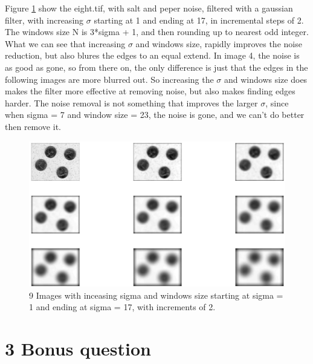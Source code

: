 \documentclass[11pt]{report}
\begin{document}
Figure \ref{fig:2_5} show the eight.tif, with salt and peper noise, filtered with a gaussian filter, with increasing $\sigma$ starting at 1 and ending at 17, in incremental steps of 2. The windows size N is 3*sigma + 1, and then rounding up to nearest odd integer. What we can see that increasing $\sigma$ and windows size, rapidly improves the noise reduction, but also blures the edges to an equal extend. In image 4, the noise is as good as gone, so from there on, the only difference is just that the edges in the following images are more blurred out. So increasing the $\sigma$ and windows size does makes the filter more effective at removing noise, but also makes finding edges harder. The noise removal is not something that improves the larger $\sigma$, since when sigma = 7 and window size = 23, the noise is gone, and we can't do better then remove it.
\begin{figure}[!ht]
    \centering
    \includegraphics[width=1\textwidth]{fig25.jpg}
    \caption{9 Images with inceasing sigma and windows size starting at sigma = 1 and ending at sigma = 17, with increments of 2.}
    \label{fig:2_5}
\end{figure}

\section{3 Bonus question}
\end{document}

